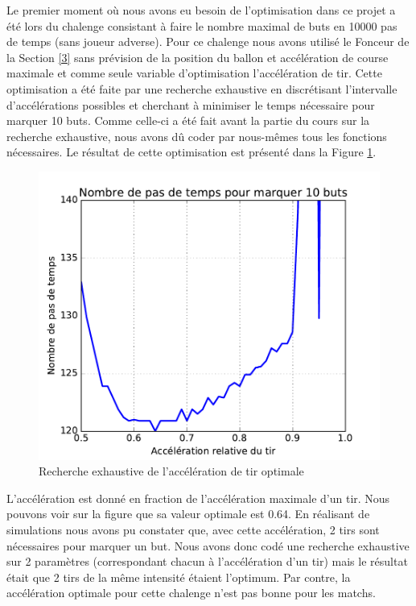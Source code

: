 \documentclass[a4paper,12pt]{article}
\begin{document}
Le premier moment où nous avons eu besoin de l'optimisation dans ce projet a été lors du chalenge consistant à faire le nombre maximal de buts en 10000 pas de temps (sans joueur adverse). Pour ce chalenge nous avons utilisé le Fonceur de la Section \ref{3} sans prévision de la position du ballon et accélération de course maximale et comme seule variable d'optimisation l'accélération de tir. Cette optimisation a été faite par une recherche exhaustive en discrétisant l’intervalle d'accélérations possibles et cherchant à minimiser le temps nécessaire pour marquer 10 buts. Comme celle-ci a été fait avant la partie du cours sur la recherche exhaustive, nous avons dû coder par nous-mêmes tous les fonctions nécessaires. Le résultat de cette optimisation est présenté dans la Figure \ref{Figure2}. 

\begin{figure}[ht]
\centering
\includegraphics[scale = 0.67]{param_search_chalenge}
\caption{Recherche exhaustive de l'accélération de tir optimale}
\label{Figure2}
\end{figure}

L'accélération est donné en fraction de l'accélération maximale d'un tir. Nous pouvons voir sur la figure que sa valeur optimale est 0.64. En réalisant de simulations nous avons pu constater que, avec cette accélération, 2 tirs sont nécessaires pour marquer un but. Nous avons donc codé une recherche exhaustive sur 2 paramètres (correspondant chacun à l’accélération d'un tir) mais le résultat était que 2 tirs de la même intensité étaient l'optimum. Par contre, la accélération optimale pour cette chalenge n'est pas bonne pour les matchs.
\end{document}
